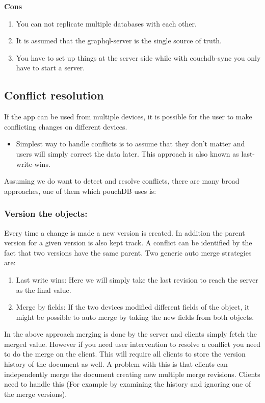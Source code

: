 \textbf{Cons}
\begin{enumerate}
    \item You can not replicate multiple databases with each other.
    \item It is assumed that the graphql-server is the single source of truth.
    \item You have to set up things at the server side while with couchdb-sync 
    you only have to start a server.~\cite{RxDB}
\end{enumerate}


\subsection{Conflict resolution}
If the app can be used from multiple devices, it is possible for the user to make 
conflicting changes on different devices.

\begin{itemize}
    \item Simplest way to handle conflicts is to assume that they don’t matter and 
    users will simply correct the data later. This approach is also known as last-write-wins.
\end{itemize}

Assuming we do want to detect and resolve conflicts, there are many broad approaches, 
one of them which pouchDB uses is:

\subsubsection{Version the objects:}

Every time a change is made a new version is created. In addition the parent version for a given 
version is also kept track. A conflict can be identified by the fact that two versions have the 
same parent. Two generic auto merge strategies are:

\begin{enumerate}
    \item Last write wins: Here we will simply take the last revision to 
    reach the server as the final value.
    \item Merge by fields: If the two devices modified different fields 
    of the object, it might be possible to auto merge by taking the new fields from both objects.
\end{enumerate}

In the above approach merging is done by the server and clients simply fetch the merged value. 
However if you need user intervention to resolve a conflict you need to do the merge on the client.
This will require all clients to store the version history of the document as well. A problem with this 
is that clients can independently merge the document creating new multiple merge revisions.
Clients need to handle this (For example by examining the history and ignoring one of the merge versions).

